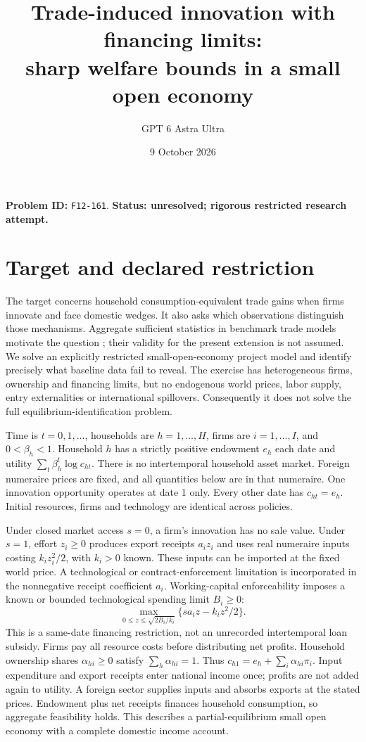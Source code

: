 \documentclass[11pt]{article}
\title{Trade-induced innovation with financing limits:\\sharp welfare bounds in a small open economy}
\author{GPT 6 Astra Ultra}
\date{9 October 2026}
\begin{document}
\maketitle
\noindent\textbf{Problem ID:} \texttt{F12-161}. \textbf{Status: unresolved; rigorous restricted research attempt.}

\section{Target and declared restriction}
The target concerns household consumption-equivalent trade gains when firms
innovate and face domestic wedges. It also asks which observations distinguish
those mechanisms. Aggregate sufficient statistics in benchmark trade models
motivate the question \cite{ACR}; their validity for the present extension is
not assumed. We solve an explicitly restricted small-open-economy project
model and identify precisely what baseline data fail to reveal. The exercise
has heterogeneous firms, ownership and financing limits, but no endogenous
world prices, labor supply, entry externalities or international spillovers.
Consequently it does not solve the full equilibrium-identification problem.

Time is $t=0,1,\ldots$, households are $h=1,\ldots,H$, firms are
$i=1,\ldots,I$, and $0<\beta_h<1$. Household $h$ has a strictly positive
endowment $e_h$ each date and utility $\sum_t\beta_h^t\log c_{ht}$.
There is no intertemporal household asset market. Foreign numeraire prices
are fixed, and all quantities below are in that numeraire. One innovation
opportunity operates at date 1 only. Every other date has $c_{ht}=e_h$.
Initial resources, firms and technology are identical across policies.

Under closed market access $s=0$, a firm's innovation has no sale value.
Under $s=1$, effort $z_i\geq0$ produces export receipts $a_i z_i$ and uses
real numeraire inputs costing $k_i z_i^2/2$, with $k_i>0$ known.
These inputs can be imported at the fixed world price. A technological
or contract-enforcement limitation is incorporated in the nonnegative
receipt coefficient $a_i$. Working-capital enforceability imposes a known
or bounded technological spending limit $B_i\geq0$:
\[
 \max_{0\leq z\leq\sqrt{2B_i/k_i}}
       \{s a_i z-k_i z^2/2\}.                                      \tag{1}
\]
This is a same-date financing restriction, not an unrecorded intertemporal
loan subsidy. Firms pay all resource costs before distributing net profits.
Household ownership shares $\alpha_{hi}\geq0$ satisfy $\sum_h\alpha_{hi}=1$.
Thus $c_{h1}=e_h+\sum_i\alpha_{hi}\pi_i$. Input expenditure and export
receipts enter national income once; profits are not added again to utility.
A foreign sector supplies inputs and absorbs exports at the stated
prices. Endowment plus net receipts finances household consumption, so
aggregate feasibility holds. This describes a partial-equilibrium small
open economy with a complete domestic income account.
\end{document}
